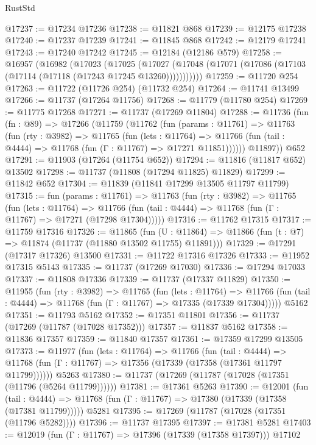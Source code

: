 \begin{lexlean}{RustStd}
\begin{coremodule}
@17237 := @17234 @17236
@17238 := @11821 @868
@17239 := @12175 @17238
@17240 := @17237 @17239
@17241 := @11845 @868
@17242 := @12179 @17241
@17243 := @17240 @17242
@17245 := @12184 (@12186 @579)
@17258 := @16957
    (@16982
      (@17023
        (@17025
          (@17027 (@17048 (@17071 (@17086 (@17103 (@17114 (@17118 (@17243 @17245 @13260)))))))))))
@17259 := @11720 @254
@17263 := @11722 (@11726 @254) (@11732 @254)
@17264 := @11741 @13499
@17266 := @11737 (@17264 @11756)
@17268 := @11779 (@11780 @254)
@17269 := @11775 @17268
@17271 := @11737 (@17269 @11804)
@17288 := @11736
    (fun (fn : @89) =>
    @17266
      (@11759
        (@11762
          (fun (params : @11761) =>
          @11763
            (fun (rty : @3982) =>
            @11765
              (fun (lets : @11764) =>
              @11766 (fun (tail : @4444) => @11768 (fun (Γ : @11767) => @17271 @11851))))))
        @11897))
    @652
@17291 := @11903 (@17264 (@11754 @652))
@17294 := @11816 (@11817 @652) @13502
@17298 := @11737 (@11808 (@17294 @11825) @11829)
@17299 := @11842 @652
@17304 := @11839 (@11841 @17299 @13505 @11797 @11799)
@17315 := fun (params : @11761) =>
  @11763
    (fun (rty : @3982) =>
    @11765
      (fun (lets : @11764) =>
      @11766 (fun (tail : @4444) => @11768 (fun (Γ : @11767) => @17271 (@17298 @17304)))))
@17316 := @11762 @17315
@17317 := @11759 @17316
@17326 := @11865
    (fun (U : @11864) => @11866 (fun (t : @7) => @11874 (@11737 (@11880 @13502 @11755) @11891)))
@17329 := @17291 (@17317 @17326) @13500
@17331 := @11722 @17316 @17326
@17333 := @11952 @17315 @5143
@17335 := @11737 (@17269 @17030)
@17336 := @17294 @17033
@17337 := @11808 @17336
@17339 := @11737 (@17337 @11829)
@17350 := @11955
    (fun (rty : @3982) =>
    @11765
      (fun (lets : @11764) =>
      @11766 (fun (tail : @4444) => @11768 (fun (Γ : @11767) => @17335 (@17339 @17304)))))
    @5162
@17351 := @11793 @5162
@17352 := @17351 @11801
@17356 := @11737 (@17269 (@11787 (@17028 @17352)))
@17357 := @11837 @5162
@17358 := @11836 @17357
@17359 := @11840 @17357
@17361 := @17359 @17299 @13505
@17373 := @11977
    (fun (lets : @11764) =>
    @11766
      (fun (tail : @4444) =>
      @11768 (fun (Γ : @11767) => @17356 (@17339 (@17358 (@17361 @11797 @11799))))))
    @5263
@17380 := @11737 (@17269 (@11787 (@17028 (@17351 (@11796 (@5264 @11799))))))
@17381 := @17361 @5263
@17390 := @12001
    (fun (tail : @4444) => @11768 (fun (Γ : @11767) => @17380 (@17339 (@17358 (@17381 @11799)))))
    @5281
@17395 := @17269 (@11787 (@17028 (@17351 (@11796 @5282))))
@17396 := @11737 @17395
@17397 := @17381 @5281
@17403 := @12019 (fun (Γ : @11767) => @17396 (@17339 (@17358 @17397))) @17102

\end{coremodule}
\end{lexlean}
